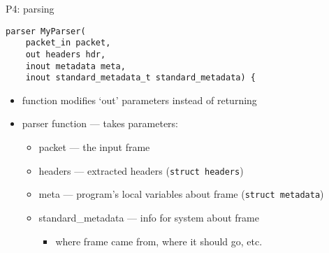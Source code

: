 \begin{frame}[fragile]{P4: parsing}
\begin{Verbatim}
parser MyParser(
    packet_in packet,
    out headers hdr,
    inout metadata meta,
    inout standard_metadata_t standard_metadata) {
\end{Verbatim}
\begin{itemize}
\item function modifies `out' parameters instead of returning
\item parser function --- takes parameters:
    \begin{itemize}
    \item packet --- the input frame
    \item headers --- extracted headers (\texttt{struct headers})
    \item meta --- program's local variables about frame (\texttt{struct metadata})
    \item standard\_metadata --- info for system about frame
        \begin{itemize}
        \item where frame came from, where it should go, etc.
        \end{itemize}
    \end{itemize}
\end{itemize}
\end{frame}

